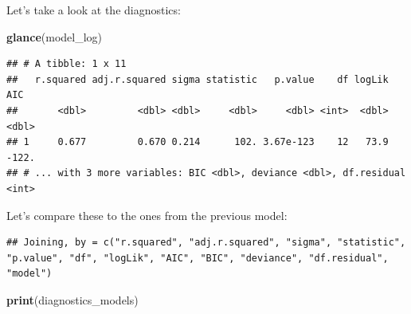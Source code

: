 \documentclass[]{gitbook}
\newenvironment{Shaded}{\begin{snugshade}}{\end{snugshade}}
\newcommand{\DataTypeTok}[1]{\textcolor[rgb]{0.13,0.29,0.53}{#1}}
\newcommand{\KeywordTok}[1]{\textcolor[rgb]{0.13,0.29,0.53}{\textbf{#1}}}
\newcommand{\NormalTok}[1]{#1}
\newcommand{\OperatorTok}[1]{\textcolor[rgb]{0.81,0.36,0.00}{\textbf{#1}}}
\newcommand{\StringTok}[1]{\textcolor[rgb]{0.31,0.60,0.02}{#1}}
\begin{document}
Let's take a look at the diagnostics:

\begin{Shaded}
\begin{Highlighting}[]
\KeywordTok{glance}\NormalTok{(model_log)}
\end{Highlighting}
\end{Shaded}

\begin{verbatim}
## # A tibble: 1 x 11
##   r.squared adj.r.squared sigma statistic   p.value    df logLik   AIC
##       <dbl>         <dbl> <dbl>     <dbl>     <dbl> <int>  <dbl> <dbl>
## 1     0.677         0.670 0.214      102. 3.67e-123    12   73.9 -122.
## # ... with 3 more variables: BIC <dbl>, deviance <dbl>, df.residual <int>
\end{verbatim}

Let's compare these to the ones from the previous model:

\begin{Shaded}
\end{Shaded}

\begin{verbatim}
## Joining, by = c("r.squared", "adj.r.squared", "sigma", "statistic", "p.value", "df", "logLik", "AIC", "BIC", "deviance", "df.residual", "model")
\end{verbatim}

\begin{Shaded}
\begin{Highlighting}[]
\KeywordTok{print}\NormalTok{(diagnostics_models)}
\end{Highlighting}
\end{Shaded}
\end{document}
